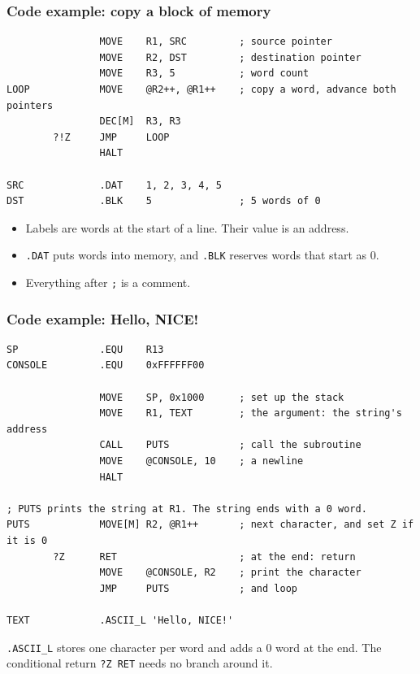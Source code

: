 \documentclass{beamer}
\newcommand{\code}[1]{\texttt{#1}}
\begin{document}
%
  \begin{frame}[fragile]
   \frametitle{Code example: copy a block of memory}
   {\scriptsize
   \begin{verbatim}
                MOVE    R1, SRC         ; source pointer
                MOVE    R2, DST         ; destination pointer
                MOVE    R3, 5           ; word count
LOOP            MOVE    @R2++, @R1++    ; copy a word, advance both pointers
                DEC[M]  R3, R3
        ?!Z     JMP     LOOP
                HALT

SRC             .DAT    1, 2, 3, 4, 5
DST             .BLK    5               ; 5 words of 0
   \end{verbatim}
   }
   \begin{itemize}
    \item Labels are words at the start of a line. Their value is an
     address.
    \item \code{.DAT} puts words into memory, and \code{.BLK} reserves
     words that start as 0.
    \item Everything after \code{;} is a comment.
   \end{itemize}
  \end{frame}
%
  \begin{frame}[fragile]
   \frametitle{Code example: Hello, NICE!}
   {\scriptsize
   \begin{verbatim}
SP              .EQU    R13
CONSOLE         .EQU    0xFFFFFF00

                MOVE    SP, 0x1000      ; set up the stack
                MOVE    R1, TEXT        ; the argument: the string's address
                CALL    PUTS            ; call the subroutine
                MOVE    @CONSOLE, 10    ; a newline
                HALT

; PUTS prints the string at R1. The string ends with a 0 word.
PUTS            MOVE[M] R2, @R1++       ; next character, and set Z if it is 0
        ?Z      RET                     ; at the end: return
                MOVE    @CONSOLE, R2    ; print the character
                JMP     PUTS            ; and loop

TEXT            .ASCII_L 'Hello, NICE!'
   \end{verbatim}
   }
   \code{.ASCII\_L} stores one character per word and adds a 0 word at
   the end. The conditional return \code{?Z RET} needs no branch around
   it.
  \end{frame}
%
\end{document}

